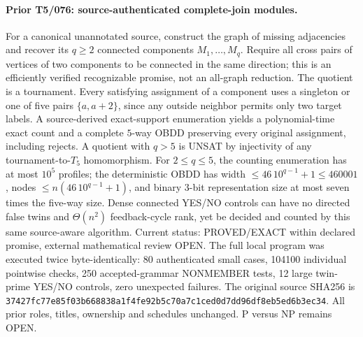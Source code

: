 \documentclass[11pt]{article}
\begin{document}
\paragraph{Prior T5/076: source-authenticated complete-join modules.}
For a canonical unannotated source, construct the graph of missing adjacencies
and recover its $q\ge2$ connected components $M_1,\ldots,M_q$.
Require all cross pairs of vertices of two components to be connected in the
same direction; this is an efficiently verified recognizable promise, not an
all-graph reduction. The quotient is a tournament. Every satisfying assignment
of a component uses a singleton or one of five pairs $\{a,a+2\}$, since any
outside neighbor permits only two target labels. A source-derived exact-support
enumeration yields a polynomial-time exact count and a complete $5$-way OBDD
preserving every original assignment, including rejects. A quotient with
$q>5$ is UNSAT by injectivity of any tournament-to-$T_5$ homomorphism.
For $2\le q\le5$, the counting enumeration has at most $10^5$ profiles;
the deterministic OBDD has width $\le46\,10^{q-1}+1\le460001$,
nodes $\le n(46\,10^{q-1}+1)$, and binary $3$-bit representation size
at most seven times the five-way size. Dense connected YES/NO controls
can have no directed false twins and $\Theta(n^2)$ feedback-cycle rank,
yet be decided and counted by this same source-aware algorithm.
Current status: PROVED/EXACT within declared promise, external mathematical
review OPEN. The full local program was executed twice byte-identically:
80 authenticated small cases, 104100 individual pointwise checks,
250 accepted-grammar NONMEMBER tests, 12 large twin-prime YES/NO controls,
zero unexpected failures. The original source SHA256 is
\texttt{37427fc77e85f03b668838a1f4fe92b5c70a7c1ced0d7dd96df8eb5ed6b3ec34}.
All prior roles, titles, ownership and schedules unchanged.
P versus NP remains OPEN.
\end{document}

